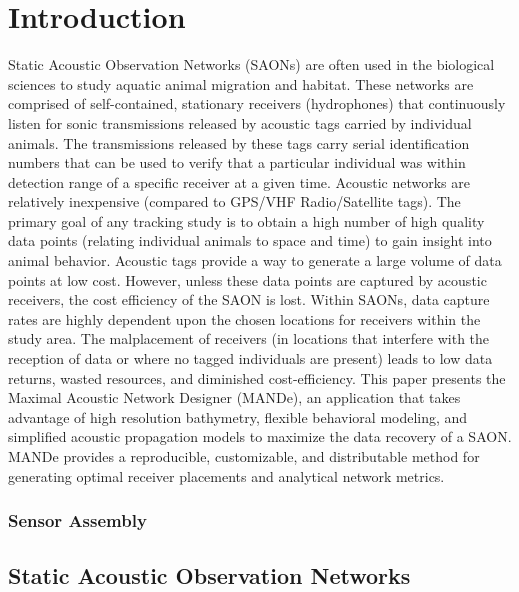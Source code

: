 \chapter{Introduction}
Static Acoustic Observation Networks (SAONs) are often used in the biological sciences to study aquatic animal migration and habitat.  These networks are comprised of self-contained, stationary receivers (hydrophones) that continuously listen for sonic transmissions released by acoustic tags carried by individual animals.  The transmissions released by these tags carry serial identification numbers that can be used to verify that a particular individual was within detection range of a specific receiver at a given time.  Acoustic networks are relatively inexpensive (compared to GPS/VHF Radio/Satellite tags).  The primary goal of any tracking study is to obtain a high number of high quality data points (relating individual animals to space and time) to gain insight into animal behavior.  Acoustic tags provide a way to generate a large volume of data points at low cost.  However, unless these data points are captured by acoustic receivers, the cost efficiency of the SAON is lost.  Within SAONs, data capture rates are highly dependent upon the chosen locations for receivers within the study area.  The malplacement of receivers (in locations that interfere with the reception of data or where no tagged individuals are present) leads to low data returns, wasted resources, and diminished cost-efficiency.  This paper presents the Maximal Acoustic Network Designer (MANDe), an application\cite{acousitcdeploy} that takes advantage of high resolution bathymetry, flexible behavioral modeling, and simplified acoustic propagation models to maximize the data recovery of a SAON.  MANDe provides a reproducible, customizable, and distributable method for generating optimal receiver placements and analytical network metrics.

\subsection{Sensor Assembly}
\section{Static Acoustic Observation Networks}

